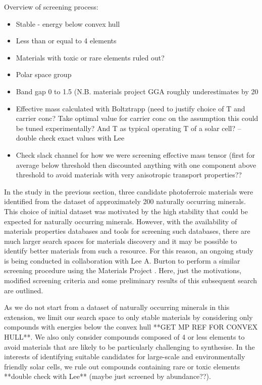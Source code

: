 \documentclass[11pt, twoside]{report}
\begin{document}
Overview of screening process:
\begin{itemize}
\item Stable - energy below convex hull
\item Less than or equal to 4 elements
\item Materials with toxic or rare elements ruled out?
\item Polar space group
\item Band gap 0 to 1.5 (N.B. materials project GGA roughly underestimates by 20%
\item Effective mass calculated with Boltztrapp (need to justify choice of T and carrier conc? Take optimal value for carrier conc on the assumption this could be tuned experimentally? And T as typical operating T of a solar cell? – double check exact values with Lee
\item Check slack channel for how we were screening effective mass tensor (first for average below threshold then discounted anything with one component above threshold to avoid materials with very anisotropic transport properties??
\end{itemize}


In the study in the previous section, three candidate photoferroic materials were identified from the dataset of approximately 200 naturally occurring minerals. This choice of initial dataset was motivated by the high stability that could be expected for naturally occurring minerals. However, with the availability of materials properties databases and tools for screening such databases, there are much larger search spaces for materials discovery and it may be possible to identify better materials from such a resource. For this reason, an ongoing study is being conducted in collaboration with Lee A. Burton to perform a similar screening procedure using the Materials Project \cite{materials_project}. Here, just the motivations, modified screening criteria and some preliminary results of this subsequent search are outlined.

As we do not start from a dataset of naturally occurring minerals in this extension, we limit our search space to only stable materials by considering only compounds with energies below the convex hull **GET MP REF FOR CONVEX HULL**. We also only consider compounds composed of 4 or less elements to avoid materials that are likely to be particularly challenging to synthesise. In the interests of identifying suitable candidates for large-scale and environmentally friendly solar cells, we rule out compounds containing rare or toxic elements **double check with Lee** (maybe just screened by abundance??).
\end{document}

